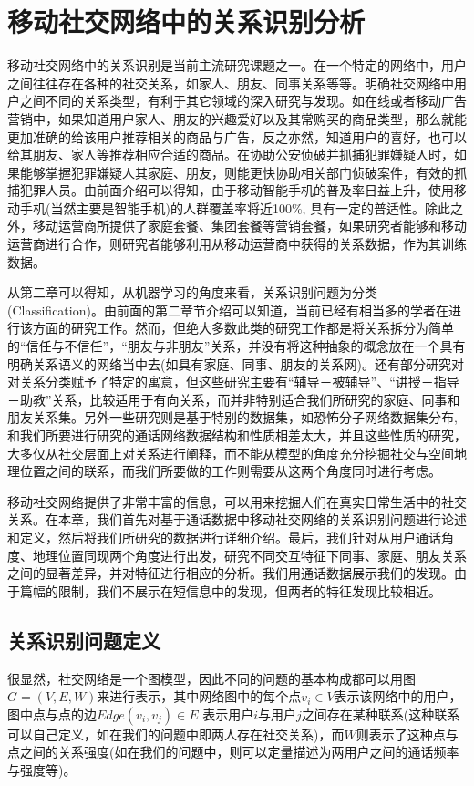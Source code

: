 \chapter{移动社交网络中的关系识别分析}

\qquad 移动社交网络中的关系识别是当前主流研究课题之一。在一个特定的网络中，用户之间往往存在各种的社交关系，如家人、朋友、同事关系等等。明确社交网络中用户之间不同的关系类型，有利于其它领域的深入研究与发现。如在线或者移动广告营销中，如果知道用户家人、朋友的兴趣爱好以及其常购买的商品类型，那么就能更加准确的给该用户推荐相关的商品与广告，反之亦然，知道用户的喜好，也可以给其朋友、家人等推荐相应合适的商品。在协助公安侦破并抓捕犯罪嫌疑人时，如果能够掌握犯罪嫌疑人其家庭、朋友，则能更快协助相关部门侦破案件，有效的抓捕犯罪人员。由前面介绍可以得知，由于移动智能手机的普及率日益上升，使用移动手机(当然主要是智能手机)的人群覆盖率将近100\%, 具有一定的普适性。除此之外，移动运营商所提供了家庭套餐、集团套餐等营销套餐，如果研究者能够和移动运营商进行合作，则研究者能够利用从移动运营商中获得的关系数据，作为其训练数据。

从第二章可以得知，从机器学习的角度来看，关系识别问题为分类(Classification)。由前面的第二章节介绍可以知道，当前已经有相当多的学者在进行该方面的研究工作。然而，但绝大多数此类的研究工作都是将关系拆分为简单的“信任与不信任”，“朋友与非朋友”关系，并没有将这种抽象的概念放在一个具有明确关系语义的网络当中去(如具有家庭、同事、朋友的关系网)。还有部分研究对对关系分类赋予了特定的寓意，但这些研究主要有“辅导－被辅导”、“讲授－指导－助教”关系，比较适用于有向关系，而并非特别适合我们所研究的家庭、同事和朋友关系集。另外一些研究则是基于特别的数据集，如恐怖分子网络数据集分布, 和我们所要进行研究的通话网络数据结构和性质相差太大，并且这些性质的研究，大多仅从社交层面上对关系进行阐释，而不能从模型的角度充分挖掘社交与空间地理位置之间的联系，而我们所要做的工作则需要从这两个角度同时进行考虑。


移动社交网络提供了非常丰富的信息，可以用来挖掘人们在真实日常生活中的社交关系。在本章，我们首先对基于通话数据中移动社交网络的关系识别问题进行论述和定义，然后将我们所研究的数据进行详细介绍。最后，我们针对从用户通话角度、地理位置同现两个角度进行出发，研究不同交互特征下同事、家庭、朋友关系之间的显著差异，并对特征进行相应的分析。我们用通话数据展示我们的发现。由于篇幅的限制，我们不展示在短信息中的发现，但两者的特征发现比较相近。

\section{关系识别问题定义}
很显然，社交网络是一个图模型，因此不同的问题的基本构成都可以用图$G = (V, E, W)$来进行表示，其中网络图中的每个点$ v_i \in V$表示该网络中的用户，图中点与点的边$Edge(v_i, v_j) \in E$ 表示用户$i$与用户$j$之间存在某种联系(这种联系可以自己定义，如在我们的问题中即两人存在社交关系)，而$W$则表示了这种点与点之间的关系强度(如在我们的问题中，则可以定量描述为两用户之间的通话频率与强度等)。

